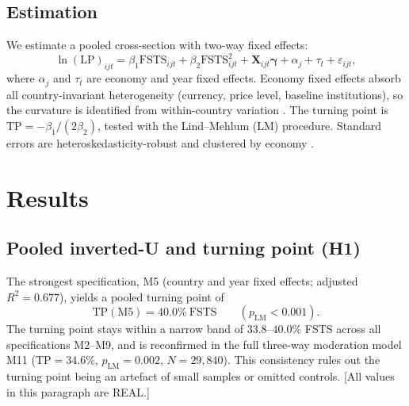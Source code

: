 \documentclass[12pt,a4paper]{article}
\begin{document}
\subsection{Estimation}
We estimate a pooled cross-section with two-way fixed effects:
\begin{equation}
\ln(\mathrm{LP})_{ijt} = \beta_1 \mathrm{FSTS}_{ijt}
  + \beta_2 \mathrm{FSTS}^2_{ijt}
  + \mathbf{X}_{ijt}\boldsymbol{\gamma}
  + \alpha_j + \tau_t + \varepsilon_{ijt},
\end{equation}
where $\alpha_j$ and $\tau_t$ are economy and year fixed effects. Economy
fixed effects absorb all country-invariant heterogeneity (currency, price
level, baseline institutions), so the curvature is identified from
within-country variation \citep{solon2015}. The turning point is
$\mathrm{TP} = -\beta_1/(2\beta_2)$, tested with the Lind--Mehlum (LM)
procedure. Standard errors are heteroskedasticity-robust and clustered by
economy \citep{cameron2015}.

\section{Results}
\subsection{Pooled inverted-U and turning point (H1)}
The strongest specification, M5 (country and year fixed effects;
adjusted $R^2 = 0.677$), yields a pooled turning point of
\[
\mathrm{TP(M5)} = 40.0\%\ \mathrm{FSTS}\qquad (p_{\mathrm{LM}} < 0.001).
\]
The turning point stays within a narrow band of $33.8$--$40.0\%$ FSTS across
all specifications M2--M9, and is reconfirmed in the full three-way
moderation model M11 ($\mathrm{TP}=34.6\%$, $p_{\mathrm{LM}}=0.002$,
$N=29{,}840$). This consistency rules out the turning point being an artefact
of small samples or omitted controls. [All values in this paragraph are REAL.]
\end{document}
